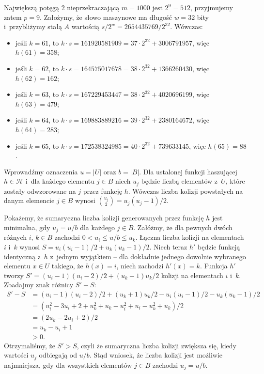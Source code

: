 \exercise %
Największą potęgą 2 nieprzekraczającą $m=1000$ jest $2^9=512$, przyjmujemy zatem $p=9$. Założymy, że słowo maszynowe ma długość $w=32$ bity i~przybliżymy stałą $A$ wartością $s/2^w=2654435769/2^{32}$. Wówczas:
\begin{itemize}
	\item jeśli $k=61$, to $k\cdot s=161920581909=37\cdot2^{32}+3006791957$, więc $h(61)=358$;
	\item jeśli $k=62$, to $k\cdot s=164575017678=38\cdot2^{32}+1366260430$, więc $h(62)=162$;
	\item jeśli $k=63$, to $k\cdot s=167229453447=38\cdot2^{32}+4020696199$, więc $h(63)=479$;
	\item jeśli $k=64$, to $k\cdot s=169883889216=39\cdot2^{32}+2380164672$, więc $h(64)=283$;
	\item jeśli $k=65$, to $k\cdot s=172538324985=40\cdot2^{32}+739633145$, więc $h(65)=88$.
\end{itemize}

\exercise %
Wprowadźmy oznaczenia $u=|U|$ oraz $b=|B|$. Dla ustalonej funkcji haszującej $h\in\mathcal{H}$ i~dla każdego elementu $j\in B$ niech $u_j$ będzie liczbą elementów z~$U$, które zostały odwzorowane na $j$ przez funkcję $h$. Wówczas liczba kolizji powstałych na danym elemencie $j\in B$ wynosi $\binom{u_j}{2}=u_j(u_j-1)/2$.

Pokażemy, że sumaryczna liczba kolizji generowanych przez funkcję $h$ jest minimalna, gdy $u_j=u/b$ dla każdego $j\in B$. Załóżmy, że dla pewnych dwóch różnych $i$, $k\in B$ zachodzi $0<u_i\le u/b\le u_k$. Łączna liczba kolizji na elementach $i$ i~$k$ wynosi $S=u_i(u_i-1)/2+u_k(u_k-1)/2$. Niech teraz $h'$ będzie funkcją identyczną z~$h$ z~jednym wyjątkiem -- dla dokładnie jednego dowolnie wybranego elementu $x\in U$ takiego, że $h(x)=i$, niech zachodzi $h'(x)=k$. Funkcja $h'$ tworzy $S'=(u_i-1)(u_i-2)/2+(u_k+1)u_k/2$ kolizji na elementach $i$ i~$k$. Zbadajmy znak różnicy $S'-S$:
\begin{align*}
	S'-S &= (u_i-1)(u_i-2)/2+(u_k+1)u_k/2-u_i(u_i-1)/2-u_k(u_k-1)/2 \\
	&= (u_i^2-3u_i+2+u_k^2+u_k-u_i^2+u_i-u_k^2+u_k)/2 \\
	&= (2u_k-2u_i+2)/2 \\
	&= u_k-u_i+1 \\
	&> 0.
\end{align*}
Otrzymaliśmy, że $S'>S$, czyli że sumaryczna liczba kolizji zwiększa się, kiedy wartości $u_j$ odbiegają od $u/b$. Stąd wniosek, że liczba kolizji jest możliwie najmniejsza, gdy dla wszystkich elementów $j\in B$ zachodzi $u_j=u/b$.

